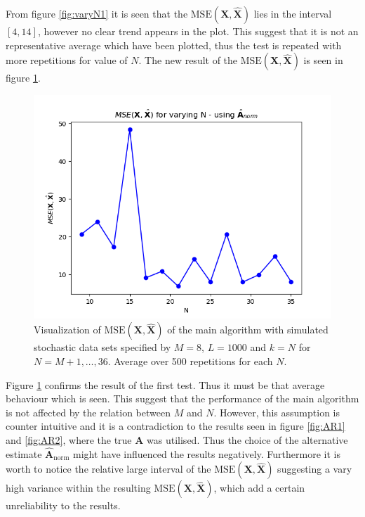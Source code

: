 \noindent
From figure \ref{fig:varyN1} it is seen that the $\text{MSE}(\mathbf{X}, \hat{\mathbf{X}})$ lies in the interval $[4,14]$, however no clear trend appears in the plot. 
This suggest that it is not an representative average which have been plotted, thus the test is repeated with more repetitions for value of $N$. The new result of the $\text{MSE}(\mathbf{X}, \hat{\mathbf{X}})$ is seen in figure \ref{fig:varyN2}.
\begin{figure}[H]
    \centering
	\includegraphics[scale=0.5]{figures/ch_6/varyN2.png}
	\caption{Visualization of $\text{MSE}(\mathbf{X}, \hat{\mathbf{X}})$ of the main algorithm with simulated stochastic data sets specified by $M = 8$, $L=1000$ and $k = N$ for $N = M+1, \hdots , 36$. Average over 500 repetitions for each $N$.}
	\label{fig:varyN2}
\end{figure}  
\noindent
Figure \ref{fig:varyN2} confirms the result of the first test. Thus it must be that average behaviour which is seen. 
This suggest that the performance of the main algorithm is not affected by the relation between $M$ and $N$.
However, this assumption is counter intuitive and it is a contradiction to the results seen in figure \ref{fig:AR1} and \ref{fig:AR2}, where the true $\mathbf{A}$ was utilised. 
Thus the choice of the alternative estimate $\hat{\mathbf{A}}_{\text{norm}}$ might have influenced the results negatively.  
Furthermore it is worth to notice the relative large interval of the $\text{MSE}(\mathbf{X}, \hat{\mathbf{X}})$ suggesting a vary high variance within the resulting $\text{MSE}(\mathbf{X}, \hat{\mathbf{X}})$, which add a certain unreliability to the results.    